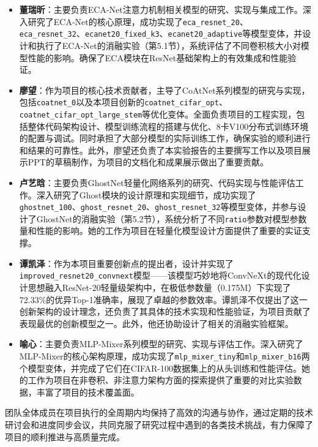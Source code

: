 \documentclass[a4paper]{article}
\begin{document}
\begin{itemize}
    \item \textbf{董瑞昕}：主要负责ECA-Net注意力机制相关模型的研究、实现与集成工作。深入研究了ECA-Net的核心原理，成功实现了\texttt{eca\_resnet\_20}、\texttt{eca\_resnet\_32}、\texttt{ecanet20\_fixed\_k3}、\texttt{ecanet20\_adaptive}等模型变体，并设计和执行了ECA-Net的消融实验（第5.1节），系统评估了不同卷积核大小对模型性能的影响。确保了ECA模块在ResNet基础架构上的有效集成和性能验证。

    \item \textbf{廖望}：作为项目的核心技术贡献者，主导了CoAtNet系列模型的研究与实现，包括\texttt{coatnet\_0}以及本项目创新的\texttt{coatnet\_cifar\_opt}、\texttt{coatnet\_cifar\_opt\_large\_stem}等优化变体。全面负责项目的工程实现，包括整体代码架构设计、模型训练流程的搭建与优化、8卡V100分布式训练环境的配置与调试。同时承担了大部分模型的实际训练工作，确保实验的顺利进行和结果的可靠性。此外，廖望还负责了本实验报告的主要撰写工作以及项目展示PPT的草稿制作，为项目的文档化和成果展示做出了重要贡献。

    \item \textbf{卢艺晗}：主要负责GhostNet轻量化网络系列的研究、代码实现与性能评估工作。深入研究了Ghost模块的设计原理和实现细节，成功实现了\texttt{ghostnet\_100}、\texttt{ghost\_resnet\_20}、\texttt{ghost\_resnet\_32}等模型变体，并参与设计了GhostNet的消融实验（第5.2节），系统分析了不同\texttt{ratio}参数对模型参数量和性能的影响。她的工作为项目在轻量化模型设计方面提供了重要的实证支撑。

    \item \textbf{谭凯泽}：作为本项目重要创新点的提出者，设计并实现了\texttt{improved\_resnet20\_convnext}模型——该模型巧妙地将ConvNeXt的现代化设计思想融入ResNet-20轻量级架构中，在极低参数量（0.175M）下实现了72.33\%的优异Top-1准确率，展现了卓越的参数效率。谭凯泽不仅提出了这一创新架构的设计理念，还负责了其具体的技术实现和性能验证，为项目贡献了表现最优的创新模型之一。此外，他还协助设计了相关的消融实验框架。

    \item \textbf{喻心}：主要负责MLP-Mixer系列模型的研究、实现与评估工作。深入研究了MLP-Mixer的核心架构原理，成功实现了\texttt{mlp\_mixer\_tiny}和\texttt{mlp\_mixer\_b16}两个模型变体，并完成了它们在CIFAR-100数据集上的从头训练和性能评估。她的工作为项目在非卷积、非注意力架构方面的探索提供了重要的对比实验数据，丰富了项目的技术覆盖面。
\end{itemize}

团队全体成员在项目执行的全周期内均保持了高效的沟通与协作，通过定期的技术研讨会和进度同步会议，共同克服了研究过程中遇到的各类技术挑战，有力保障了项目的顺利推进与高质量完成。
\end{document}
